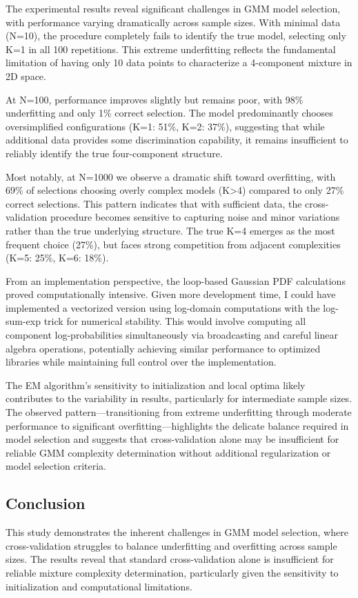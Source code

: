 \documentclass[12pt]{article}
\begin{document}
The experimental results reveal significant challenges in GMM model selection, with performance varying dramatically across sample sizes. With minimal data (N=10), the procedure completely fails to identify the true model, selecting only K=1 in all 100 repetitions. This extreme underfitting reflects the fundamental limitation of having only 10 data points to characterize a 4-component mixture in 2D space.

At N=100, performance improves slightly but remains poor, with 98\% underfitting and only 1\% correct selection. The model predominantly chooses oversimplified configurations (K=1: 51\%, K=2: 37\%), suggesting that while additional data provides some discrimination capability, it remains insufficient to reliably identify the true four-component structure.

Most notably, at N=1000 we observe a dramatic shift toward overfitting, with 69\% of selections choosing overly complex models (K>4) compared to only 27\% correct selections. This pattern indicates that with sufficient data, the cross-validation procedure becomes sensitive to capturing noise and minor variations rather than the true underlying structure. The true K=4 emerges as the most frequent choice (27\%), but faces strong competition from adjacent complexities (K=5: 25\%, K=6: 18\%).

From an implementation perspective, the loop-based Gaussian PDF calculations proved computationally intensive. Given more development time, I could have implemented a vectorized version using log-domain computations with the log-sum-exp trick for numerical stability. This would involve computing all component log-probabilities simultaneously via broadcasting and careful linear algebra operations, potentially achieving similar performance to optimized libraries while maintaining full control over the implementation.

The EM algorithm's sensitivity to initialization and local optima likely contributes to the variability in results, particularly for intermediate sample sizes. The observed pattern—transitioning from extreme underfitting through moderate performance to significant overfitting—highlights the delicate balance required in model selection and suggests that cross-validation alone may be insufficient for reliable GMM complexity determination without additional regularization or model selection criteria.

\subsection{Conclusion}
This study demonstrates the inherent challenges in GMM model selection, where cross-validation struggles to balance underfitting and overfitting across sample sizes. The results reveal that standard cross-validation alone is insufficient for reliable mixture complexity determination, particularly given the sensitivity to initialization and computational limitations. 
\end{document}
